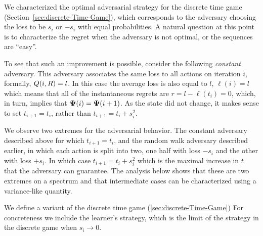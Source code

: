 \documentclass{article}[12pt]
\begin{document}
We characterized the optimal adversarial strategy for the discrete
time game (Section~\ref{sec:discrete-Time-Game}), which corresponds
to the adversary choosing the loss to be $s_i$ or $-s_i$ with equal
probabilities. A natural question at this point is to characterize the
regret when the adversary is not optimal, or the sequences are ``easy''.

To see that such an improvement is possible, consider the following
{\em constant} adversary. This adversary associates the same loss to
all actions on iteration $i$, formally, $Q(i,R) = l$. In this
case the average loss is also equal to $l$, $\ell(i)=l$ which means
that all of the instantaneous regrets are $r=l-\ell(t_i) = 0$, which,
in turn, implies that ${\bf \Psi}(i) = {\bf \Psi}(i+1)$. As the state did not
change, it makes sense to set $t_{i+1}=t_i$, rather than
$t_{i+1}=t_i+s_i^2$.

We observe two extremes for the adversarial behavior. The constant
adversary described above for which $t_{i+1} = t_i$, and the random walk adversary described
earlier, in which each action is split into two, one half with loss
$-s_i$ and the other with loss $+s_i$. In which case $t_{i+1} =
t_i+s_i^2$ which is the maximal increase in $t$ that the adversary can
guarantee. The analysis below shows that these are two extremes on a
spectrum and that intermediate cases can be characterized using a
variance-like quantity.

We define a variant of the discrete time game
(\ref{sec:discrete-Time-Game}) For concreteness we include the
learner's strategy, which is the limit of the strategy in the discrete
game when $s_i \to 0$.
\end{document}
